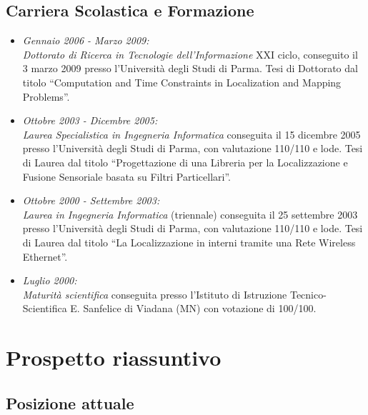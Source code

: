 \documentclass[11pt]{article}
\newcommand{\ITEMDATE}[1]{\item \textit{#1:}\\}
\begin{document}

\subsection*{Carriera Scolastica e Formazione}

\begin{itemize}
\itemsep0em 
\ITEMDATE{Gennaio 2006 - Marzo 2009}
  \emph{Dottorato di Ricerca in Tecnologie dell'Informazione} 
  XXI ciclo, conseguito il 3 marzo 2009 presso l'Universit\`a degli Studi di Parma.
  Tesi di Dottorato dal titolo ``Computation and Time Constraints in Localization and Mapping Problems''.
\ITEMDATE{Ottobre 2003 - Dicembre 2005}
\emph{Laurea Specialistica in Ingegneria Informatica}
conseguita il 15 dicembre 2005 presso l'Universit\`a degli Studi di Parma, 
con valutazione 110/110 e lode.
Tesi di Laurea dal titolo ``Progettazione di una Libreria per la Localizzazione 
e Fusione Sensoriale basata su Filtri Particellari''.
\ITEMDATE{Ottobre 2000 - Settembre 2003}
\emph{Laurea in Ingegneria Informatica} (triennale) 
conseguita il 25 settembre 2003 presso l'Universit\`a degli Studi di Parma, 
con valutazione 110/110 e lode.
Tesi di Laurea dal titolo ``La Localizzazione in interni tramite una Rete Wireless 
Ethernet''.
\ITEMDATE{Luglio 2000}
\emph{Maturit\`a scientifica} conseguita
presso l'Istituto di Istruzione Tecnico-Scientifica E. Sanfelice di Viadana (MN) con votazione di 100/100.

\end{itemize}


\section{Prospetto riassuntivo}


\subsection*{Posizione attuale}
\end{document}
